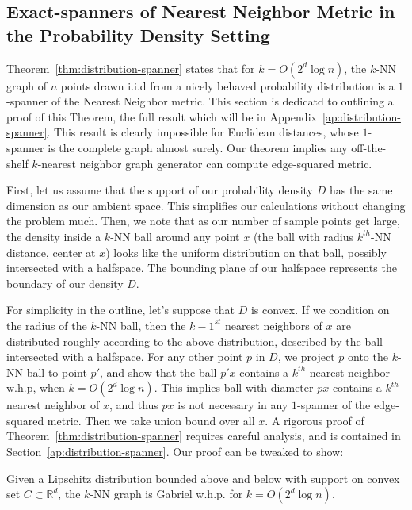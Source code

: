 \subsection{Exact-spanners of Nearest Neighbor Metric in
the Probability Density Setting
}\label{sec:distribution-spanner}

Theorem~\ref{thm:distribution-spanner} states that for $k= O(2^d \log n)$, the $k$-NN graph of $n$ points drawn i.i.d from
a nicely behaved probability distribution is a $1$-spanner of the
Nearest Neighbor metric. This section is dedicatd to outlining a proof of
this Theorem, the full result which will be in
Appendix~\ref{ap:distribution-spanner}.
This result is clearly impossible for Euclidean distances,
whose $1$-spanner is the complete graph almost surely.  
Our theorem implies any off-the-shelf
$k$-nearest neighbor graph generator can compute
edge-squared metric. 

First, let us assume that the support of our
probability density $D$ has the same dimension as our ambient space.
This simplifies our calculations without changing the problem
much. Then, we note that as our number of sample points get
large, the density inside a $k$-NN ball around any point $x$ (the ball with radius
$k^{th}$-NN
distance, center at $x$) looks like the uniform distribution
on that ball, possibly intersected with a halfspace. The bounding
plane of our halfspace
represents the boundary of our density $D$.

For simplicity in the outline, let's suppose that $D$ is convex.
If we condition on
the radius of the $k$-NN ball, then the $k-1^{st}$ nearest
neighbors of $x$ are distributed roughly according to the above
distribution, described by the ball intersected with a halfspace.
For any other point $p$ in $D$, we project $p$ onto the $k$-NN
ball to point $p'$, and show that the ball $p'x$ contains a $k^{th}$ nearest
neighbor w.h.p, when $k=O(2^d \log n)$. This
implies ball with diameter $px$ contains a $k^{th}$ nearest
neighbor of $x$, and thus $px$ is not necessary in any
$1$-spanner of the edge-squared metric. Then we take union bound
over all $x$.
A rigorous proof of
Theorem~\ref{thm:distribution-spanner} requires careful analysis, 
and is contained in
Section~\ref{ap:distribution-spanner}.  
Our proof can be tweaked to show:
\begin{theorem}
  Given a Lipschitz distribution bounded above and below with support on convex set $C \subset
  \mathbb{R}^d$, the $k$-NN graph is Gabriel w.h.p. for $k =
  O(2^d \log n)$.
\end{theorem}
